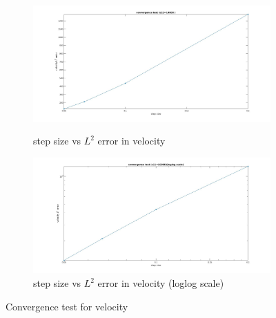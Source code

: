 \documentclass[a4paper,oneside,openright,spanish,english]{book}
\begin{document}
\begin{figure}
\begin{subfigure}{\textwidth}	
  \includegraphics[width=\linewidth]{step_size_vs_velocity_l2_error.jpg}
  \caption{step size vs $L^2$ error in velocity} 
  \label{step_size_vs_velocity_l2_error}
  \includegraphics[width=\linewidth]{step_size_vs_velocity_l2_error_loglog.jpg}
  \caption{step size vs $L^2$ error in velocity (loglog scale)} 
  \label{step_size_vs_velocity_l2_error_loglog}
\end{subfigure}
\caption{Convergence test for velocity}
\label{convergence_check_velocity}
\end{figure}
\end{document}
